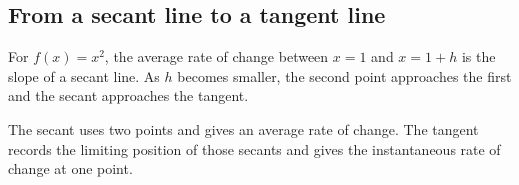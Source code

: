 \subsection{From a secant line to a tangent line}

For $f(x)=x^2$, the average rate of change between $x=1$ and $x=1+h$ is the slope of a secant line. As $h$ becomes smaller, the second point approaches the first and the secant approaches the tangent.

\begin{center}
\end{center}

\begin{interpretationbox}
The secant uses two points and gives an average rate of change. The tangent records the limiting position of those secants and gives the instantaneous rate of change at one point.
\end{interpretationbox}
